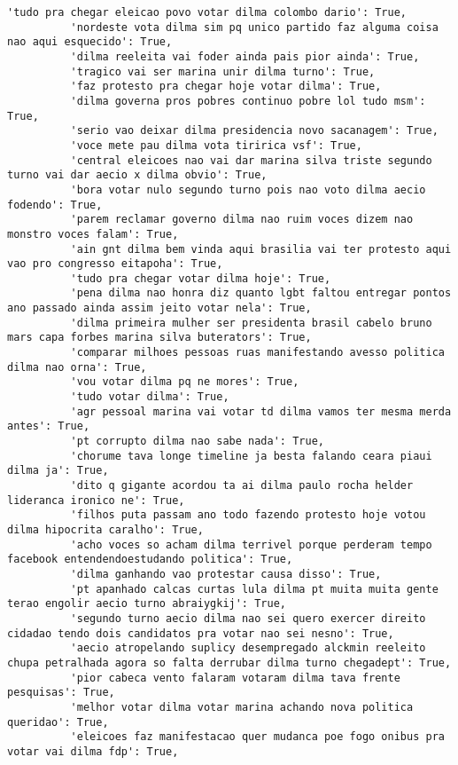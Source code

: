 \documentclass[11pt]{article}
\begin{document}
\begin{Verbatim}[commandchars=\\\{\}]
          'tudo pra chegar eleicao povo votar dilma colombo dario': True,
          'nordeste vota dilma sim pq unico partido faz alguma coisa nao aqui esquecido': True,
          'dilma reeleita vai foder ainda pais pior ainda': True,
          'tragico vai ser marina unir dilma turno': True,
          'faz protesto pra chegar hoje votar dilma': True,
          'dilma governa pros pobres continuo pobre lol tudo msm': True,
          'serio vao deixar dilma presidencia novo sacanagem': True,
          'voce mete pau dilma vota tiririca vsf': True,
          'central eleicoes nao vai dar marina silva triste segundo turno vai dar aecio x dilma obvio': True,
          'bora votar nulo segundo turno pois nao voto dilma aecio fodendo': True,
          'parem reclamar governo dilma nao ruim voces dizem nao monstro voces falam': True,
          'ain gnt dilma bem vinda aqui brasilia vai ter protesto aqui vao pro congresso eitapoha': True,
          'tudo pra chegar votar dilma hoje': True,
          'pena dilma nao honra diz quanto lgbt faltou entregar pontos ano passado ainda assim jeito votar nela': True,
          'dilma primeira mulher ser presidenta brasil cabelo bruno mars capa forbes marina silva buterators': True,
          'comparar milhoes pessoas ruas manifestando avesso politica dilma nao orna': True,
          'vou votar dilma pq ne mores': True,
          'tudo votar dilma': True,
          'agr pessoal marina vai votar td dilma vamos ter mesma merda antes': True,
          'pt corrupto dilma nao sabe nada': True,
          'chorume tava longe timeline ja besta falando ceara piaui dilma ja': True,
          'dito q gigante acordou ta ai dilma paulo rocha helder lideranca ironico ne': True,
          'filhos puta passam ano todo fazendo protesto hoje votou dilma hipocrita caralho': True,
          'acho voces so acham dilma terrivel porque perderam tempo facebook entendendoestudando politica': True,
          'dilma ganhando vao protestar causa disso': True,
          'pt apanhado calcas curtas lula dilma pt muita muita gente terao engolir aecio turno abraiygkij': True,
          'segundo turno aecio dilma nao sei quero exercer direito cidadao tendo dois candidatos pra votar nao sei nesno': True,
          'aecio atropelando suplicy desempregado alckmin reeleito chupa petralhada agora so falta derrubar dilma turno chegadept': True,
          'pior cabeca vento falaram votaram dilma tava frente pesquisas': True,
          'melhor votar dilma votar marina achando nova politica queridao': True,
          'eleicoes faz manifestacao quer mudanca poe fogo onibus pra votar vai dilma fdp': True,

\end{Verbatim}
\end{document}
